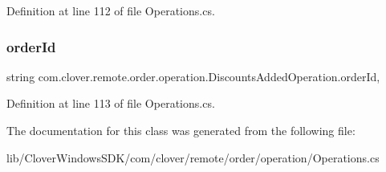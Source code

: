 Definition at line 112 of file Operations.\+cs.

\mbox{\label{classcom_1_1clover_1_1remote_1_1order_1_1operation_1_1_discounts_added_operation_a26508f0e0f75902bd4f348b74a831c8b}} 
\subsubsection{\texorpdfstring{order\+Id}{orderId}}
{\footnotesize\ttfamily string com.\+clover.\+remote.\+order.\+operation.\+Discounts\+Added\+Operation.\+order\+Id\hspace{0.3cm}{\ttfamily [get]}, {\ttfamily [set]}}



Definition at line 113 of file Operations.\+cs.



The documentation for this class was generated from the following file\+:\begin{DoxyCompactItemize}
\item 
lib/\+Clover\+Windows\+S\+D\+K/com/clover/remote/order/operation/Operations.\+cs\end{DoxyCompactItemize}
